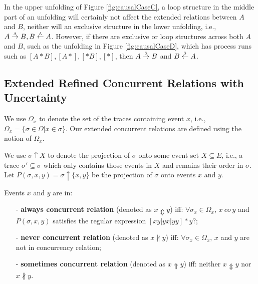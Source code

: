 \documentclass{llncs}
\begin{document}
In the upper unfolding of Figure \ref{fig:causalCaseC}, a loop structure in the middle part of an unfolding will certainly not affect the extended relations between $A$ and $B$, neither will an exclusive structure in the lower unfolding, i.e., $A\overset{\text{\tiny{A}}}{\rightarrow} B,B\overset{\text{\tiny{A}}}{\leftarrow} A$. However, if there are exclusive or loop structures across both $A$ and $B$, such as the unfolding in Figure \ref{fig:causalCaseD}, which has process runs such as $[A*B],[A*],[*B],[*]$, then $A\overset{\text{\tiny{S}}}{\rightarrow} B$ and $B\overset{\text{\tiny{S}}}{\leftarrow} A$.

\subsection{Extended Refined Concurrent Relations with Uncertainty}\label{subsec:concurrent}
We use $\Omega_{x}$ to denote the set of the traces containing event $x$, i.e., $\Omega_{x}=\{\sigma\in\Omega|x\in\sigma\}$. Our extended concurrent relations are defined using the notion of $\Omega_{x}$.

We use $\sigma\uparrow X$ to denote the projection of $\sigma$ onto some event set $X\subseteq E$, i.e., a trace $\sigma'\subseteq\sigma$ which only contains those events in $X$ and remains their order in $\sigma$. Let $P(\sigma,x,y)=\sigma\uparrow\{x,y\}$ be the projection of $\sigma$ onto events $x$ and $y$.

\begin{definition}\label{def:extendedConcurrent}
Events $x$ and $y$ are in:
	\begin{itemize}
		\item[-] \textbf{always concurrent relation} (denoted as $x\Updownarrow y$) iff: $\forall\sigma_{x}\in\Omega_{x}$, $x~co~y$ and $P(\sigma,x,y)$ satisfies the regular expression $[xy|yx|yy]*y?$;
		\item[-] \textbf{never concurrent relation} (denoted as $x\nparallel y$) iff: $\forall\sigma_{x}\in\Omega_{x}$, $x$ and $y$ are not in concurrency relation;
		\item[-] \textbf{sometimes concurrent relation} (denoted as $x\Uparrow y$) iff: neither $x\Updownarrow y$ nor $x\nparallel y$.
	\end{itemize}
\end{definition}
\end{document}
